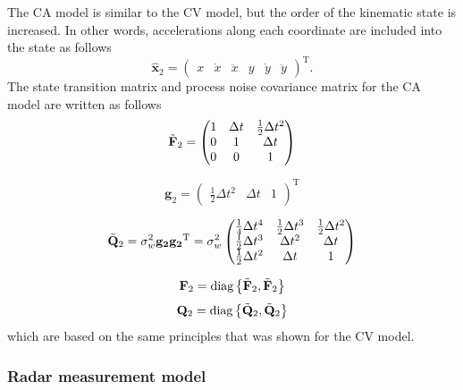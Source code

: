 \documentclass[english, 12pt, a4paper, elec, utf8, a-1b, online]{aaltothesis}
\numberwithin{equation}{section}
\renewcommand{\vec}[1]{\mathbf{#1}}
\newcommand{\transpose}[1]{#1^\text{T}}
\newcommand{\dt}{\Delta t}
\newcommand{\diag}[1]{\text{diag}\left\{ #1 \right\}}
\begin{document}
The CA model is similar to the CV model, but the order of the kinematic state is increased.
In other words, accelerations along each coordinate are included into the state as follows  
\begin{equation}\label{eq:x_mode2}
    \hat{\mathbf{x}}_2 =
        \transpose{
        \begin{pmatrix}
            x & \dot{x} & \ddot{x} & y & \dot{y} & \ddot{y}
        \end{pmatrix}}.
\end{equation}
The state transition matrix and process noise covariance matrix for the CA model are written as follows
\begin{equation}\label{eq:f_mode2}
    \Tilde{\vec{F}}_2 = 
    \begin{pmatrix}
        1 & \dt & \frac{1}{2}\dt^2  \\ 
        0 & 1 & \dt \\
        0 & 0 & 1  \\
    \end{pmatrix}
\end{equation}

\begin{equation}
    \vec{g}_2 = \transpose{
        \begin{pmatrix}
            \frac{1}{2} \dt^2 & \dt & 1
        \end{pmatrix}
    }
\end{equation}

\begin{equation}
    \Tilde{\vec{Q}}_2 = \sigma_w^2 \vec{g_2} \transpose{\vec{g_2}}  =  \sigma_w^2
        \begin{pmatrix}
            \frac{1}{4} \dt^4 & \frac{1}{2} \dt^3 & \frac{1}{2} \dt^2 \\ 
            \frac{1}{2} \dt^3 & \dt^2 &  \dt \\
            \frac{1}{2} \dt^2 & \dt & 1
        \end{pmatrix}
\end{equation}

\begin{equation}\label{eq:F_mode2}
\vec{F}_2 = \diag{\Tilde{\vec{F}}_2, \Tilde{\vec{F}}_2}
\end{equation}
\begin{equation}
    \vec{Q}_2 = \diag{\Tilde{\vec{Q}}_2, \Tilde{\vec{Q}}_2}
\end{equation}
which are based on the same principles that was shown for the CV model.

\subsubsection{Radar measurement model} \label{sec:measurement_model}
\end{document}
